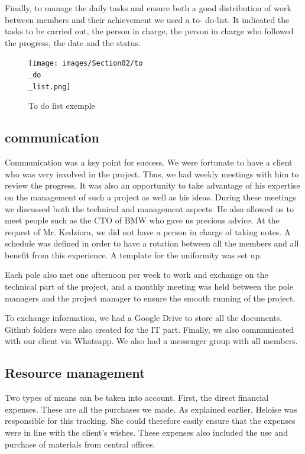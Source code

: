 \bigbreak
Finally, to manage the daily tasks and ensure both a good distribution of work between members and their achievement we used a to- do-list. It indicated the tasks to be carried out, the person in charge, the person in charge who followed the progress, the date and the status. 

\begin{figure}[ht]
    \centering
    \texttt{[image: images/Section02/to\\\_do\\\_list.png]}
    \caption{To do list exemple}
    \label{fig:mesh6}
\end{figure}

\subsection{communication}

Communication was a key point for success. We were fortunate to have a client who was very involved in the project. Thus, we had weekly meetings with him to review the progress. It was also an opportunity to take advantage of his expertise on the management of such a project as well as his ideas. During these meetings we discussed both the technical and management aspects. He also allowed us to meet people such as the CTO of BMW who gave us precious advice. At the request of Mr. Kedziora, we did not have a person in charge of taking notes. A schedule was defined in order to have a rotation between all the members and all benefit from this experience. A template for the uniformity was set up. 

\bigbreak
Each pole also met one afternoon per week to work and exchange on the technical part of the project, and a monthly meeting was held between the pole managers and the project manager to ensure the smooth running of the project. 

\bigbreak
To exchange information, we had a Google Drive to store all the documents. Github folders were also created for the IT part. Finally, we also communicated with our client via Whatsapp. We also had a messenger group with all members. 

\subsection{Resource management}

Two types of means can be taken into account. First, the direct financial expenses. These are all the purchases we made. As explained earlier, Heloise was responsible for this tracking. She could therefore easily ensure that the expenses were in line with the client's wishes. These expenses also included the use and purchase of materials from central offices. 

